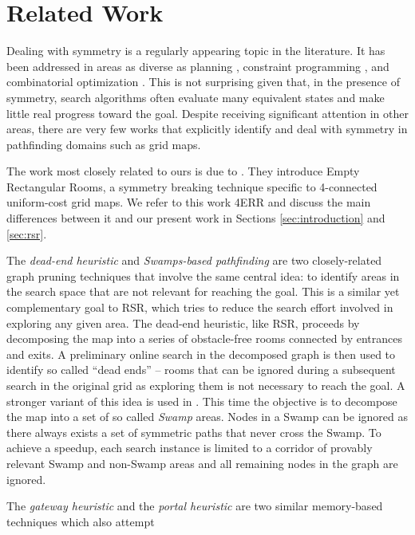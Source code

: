 \section{Related Work}
\label{sec:relatedwork}
Dealing with symmetry is a regularly appearing topic in the literature.  It has
been addressed in areas as diverse as planning \cite{fox99}, constraint programming
\cite{gent00}, and combinatorial optimization \cite{fukunaga08}.  This is not
surprising given that, in the presence of symmetry, search algorithms often
evaluate many equivalent states and make little real progress toward the goal.
Despite receiving significant attention in other areas, there are very few
works that explicitly identify and deal with symmetry in pathfinding domains 
such as grid maps. 
\par
The work most closely related to ours is due to \cite{harabor10}.  They
introduce Empty Rectangular Rooms, a symmetry breaking technique specific to
4-connected uniform-cost grid maps.  We refer to this work 4ERR and discuss the
main differences between it and our present work in Sections
\ref{sec:introduction} and \ref{sec:rsr}.
\par
The \emph{dead-end heuristic} \cite{bjornsson06} and \emph{Swamps-based
pathfinding} \cite{pochter10} are two closely-related graph pruning techniques
that involve the same central idea: to identify areas in the search space that
are not relevant for reaching the goal. This is a similar yet complementary goal
to RSR, which tries to reduce the search effort involved in exploring any given
area.  The dead-end heuristic, like RSR, proceeds by decomposing the map into a
series of obstacle-free rooms connected by entrances and exits.  A preliminary
online search in the decomposed graph is then used to identify so called ``dead
ends'' -- rooms that can be ignored during a subsequent search in the original
grid as exploring them is not necessary to reach the goal.  A stronger variant
of this idea is used in \cite{pochter10}.
This time the objective is to decompose the map into a set of so 
called \emph{Swamp} areas. Nodes in a Swamp can be ignored as there always
exists a set of symmetric paths that never cross the Swamp.  To achieve a
speedup, each search instance is limited to a corridor of provably relevant
Swamp and non-Swamp areas and all remaining nodes in the graph are ignored.
\par
The \emph{gateway heuristic} \cite{bjornsson06} and the \emph{portal heuristic}
\cite{goldenberg10} are two similar memory-based techniques which also attempt
